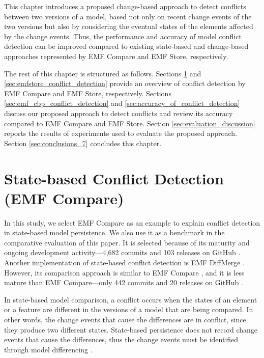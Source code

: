 This chapter introduces a proposed change-based approach to detect conflicts between two versions of a model, based not only on recent change events of the two versions but also by considering the eventual states of the elements affected by the change events. Thus, the performance and accuracy of model conflict detection can be improved compared to existing state-based and change-based approaches represented by EMF Compare and EMF Store, respectively.

The rest of this chapter is structured as follows. Sections \ref{sec:emfcompare_conflict_detection} and \ref{sec:emfstore_conflict_detection} provide an overview of conflict detection by EMF Compare and EMF Store, respectively. Sections \ref{sec:emf_cbp_conflict_detection} and \ref{sec:accuracy_of_conflict_detection} discuss our proposed approach to detect conflicts and review its accuracy compared to EMF Compare and EMF Store. Section \ref{sec:evaluation_discussion} reports the results of experiments used to evaluate the proposed approach. Section \ref{sec:conclusions_7} concludes this chapter.

\section{State-based Conflict Detection (EMF Compare)}
\label{sec:emfcompare_conflict_detection}

In this study, we select EMF Compare \cite{emfcompare2018developer} as an example to explain conflict detection in state-based model persistence. We also use it as a benchmark in the comparative evaluation of this paper. It is selected because of its maturity and ongoing development activity—4,682 commits and 103 releases on GitHub \cite{github2019emfcompare}. Another implementation of state-based conflict detection is EMF DiffMerge \cite{eclipse2019emfdiffmerge}. However, its comparison approach is similar to EMF Compare \cite{eclipse2019emfdiffmerge}, and it is less mature than EMF Compare—only 442 commits and 20 releases on GitHub \cite{github2019emfdiffmerge}.

In state-based model comparison, a conflict occurs when the states of an element or a feature are different in the versions of a model that are being compared. In other words, the change events that cause the differences are in conflict, since they produce two different states. State-based persistence does not record change events that cause the differences, thus the change events must be identified through model differencing \cite{emfcompare2018developer,yohannis2019efficient}.

